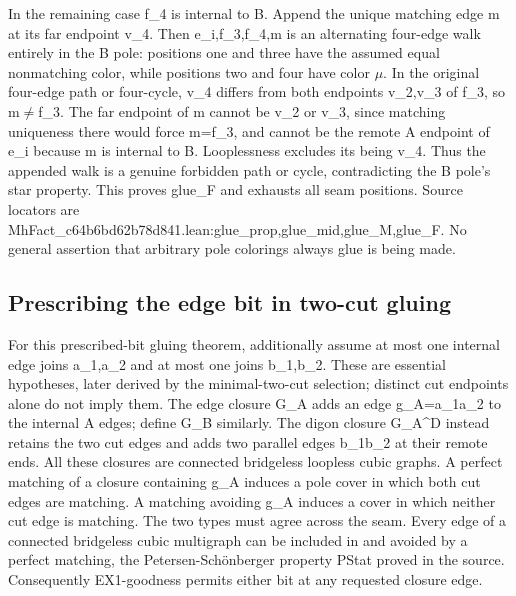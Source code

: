 \documentclass[11pt,a4paper]{article}
\begin{document}
In the remaining case f\_4 is internal to B. Append the unique matching edge m at its far endpoint v\_4. Then e\_i,f\_3,f\_4,m is an alternating four-edge walk entirely in the B pole: positions one and three have the assumed equal nonmatching color, while positions two and four have color \ensuremath{\mu}. In the original four-edge path or four-cycle, v\_4 differs from both endpoints v\_2,v\_3 of f\_3, so m\ensuremath{\neq}f\_3. The far endpoint of m cannot be v\_2 or v\_3, since matching uniqueness there would force m=f\_3, and cannot be the remote A endpoint of e\_i because m is internal to B. Looplessness excludes its being v\_4. Thus the appended walk is a genuine forbidden path or cycle, contradicting the B pole's star property. This proves glue\_F and exhausts all seam positions. Source locators are MhFact\_c64b6bd62b78d841.lean:glue\_prop,glue\_mid,glue\_M,glue\_F. No general assertion that arbitrary pole colorings always glue is being made.

\subsection{Prescribing the edge bit in two-cut gluing}
For this prescribed-bit gluing theorem, additionally assume at most one internal edge joins a\_1,a\_2 and at most one joins b\_1,b\_2. These are essential hypotheses, later derived by the minimal-two-cut selection; distinct cut endpoints alone do not imply them. The edge closure G\_A adds an edge g\_A=a\_1a\_2 to the internal A edges; define G\_B similarly. The digon closure G\_A\textasciicircum{}D instead retains the two cut edges and adds two parallel edges b\_1b\_2 at their remote ends. All these closures are connected bridgeless loopless cubic graphs. A perfect matching of a closure containing g\_A induces a pole cover in which both cut edges are matching. A matching avoiding g\_A induces a cover in which neither cut edge is matching. The two types must agree across the seam. Every edge of a connected bridgeless cubic multigraph can be included in and avoided by a perfect matching, the Petersen-Schönberger property PStat proved in the source. Consequently EX1-goodness permits either bit at any requested closure edge.
\end{document}
